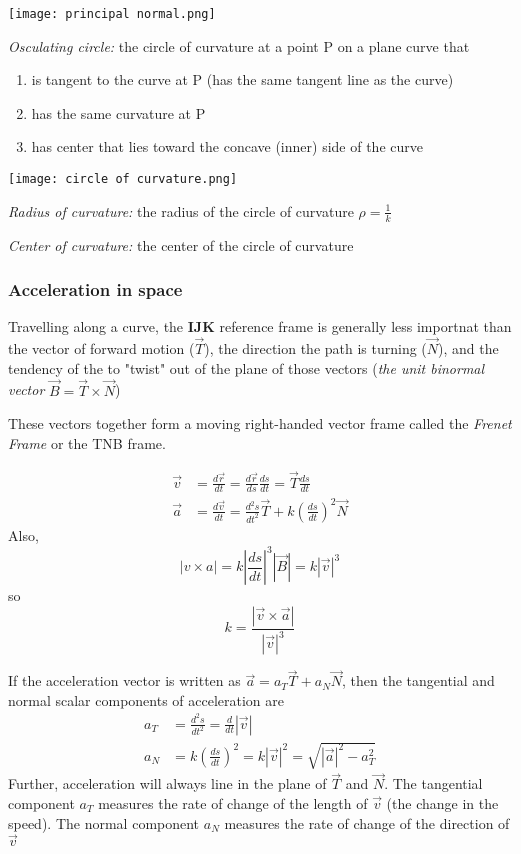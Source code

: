 \documentclass[12pt]{article}
\begin{document}
\begin{center}
    \texttt{[image: principal normal.png]}
\end{center}

\emph{Osculating circle:} the circle of curvature at a point P on a plane curve that 
\begin{enumerate}
    \item is tangent to the curve at P (has the same tangent line as the curve)
    \item has the same curvature at P
    \item has center that lies toward the concave (inner) side of the curve
\end{enumerate}

\begin{center}
    \texttt{[image: circle of curvature.png]}
\end{center}
\emph{Radius of curvature:} the radius of the circle of curvature $\rho = \frac{1}{k}$

\emph{Center of curvature:} the center of the circle of curvature

\subsubsection{Acceleration in space}
Travelling along a curve, the \textbf{IJK} reference frame is generally less importnat than the vector of forward motion ($\vec{T}$), the direction the path is turning ($\vec{N}$), and the tendency of the to "twist" out of the plane of those vectors (\emph{the unit binormal vector} $\vec{B} = \vec{T} \times \vec{N}$)

These vectors together form a moving right-handed vector frame called the \emph{Frenet Frame} or the TNB frame.

\begin{align*}
    \vec{v} &= \frac{d\vec{r}}{dt} = \frac{d\vec{r}}{ds} \frac{ds}{dt} = \vec{T} \frac{ds}{dt}\\
    \vec{a} &= \frac{d\vec{v}}{dt} = \frac{d^2 s}{dt^2} \vec{T} + k \left(\frac{ds}{dt}\right)^2 \vec{N} 
\end{align*}
Also, 
\[|v\times a| = k \left|\frac{ds}{dt}\right|^3 |\vec{B}| = k |\vec{v}|^3\]
so 
\[k = \frac{|\vec{v} \times \vec{a}|}{|\vec{v}|^3}\]

If the acceleration vector is written as $\vec{a} = a_T \vec{T} + a_N \vec{N}$, then the tangential and normal scalar components of acceleration are 
\begin{align*}
    a_T &= \frac{d^2 s}{dt^2} = \frac{d}{dt} |\vec{v}|\\
    a_N &= k \left(\frac{ds}{dt}\right)^2 = k |\vec{v}|^2 = \sqrt{|\vec{a}|^2 - a_T^2}
\end{align*}
Further, acceleration will always line in the plane of $\vec{T}$ and $\vec{N}$. The tangential component $a_T$ measures the rate of change of the length of $\vec{v}$ (the change in the speed). The normal component $a_N$ measures the rate of change of the direction of $\vec{v}$
\end{document}
